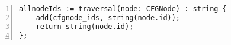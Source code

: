\begin{figure}[ht!]
\begin{lstlisting}[numbers=left, tabsize=4, escapechar=@, caption={Example traversal construct that traverses a CFG and collects each nodes id in a global variable},label={lst:traversal-syntax}] 
allnodeIds := traversal(node: CFGNode) : string {
	add(cfgnode_ids, string(node.id));
	return string(node.id);
};
\end{lstlisting}
\end{figure}


